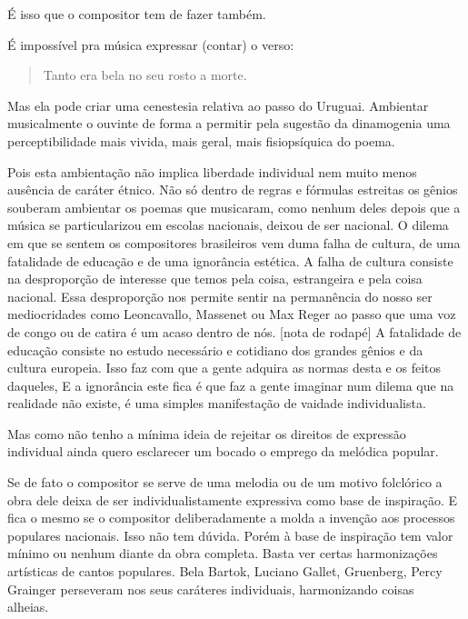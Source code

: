 É isso que o compositor tem de fazer também.~

É impossível pra música expressar (contar) o verso:~

\begin{verse}
Tanto era bela no seu rosto a morte.
\end{verse}

Mas ela pode criar uma cenestesia relativa ao passo do Uruguai.
Ambientar musicalmente o ouvinte de forma a permitir pela sugestão da
dinamogenia uma perceptibilidade mais vivida, mais geral, mais
fisiopsíquica do poema.~

Pois esta ambientação não implica liberdade individual nem muito menos
ausência de caráter étnico. Não só dentro de regras e fórmulas estreitas
os gênios souberam ambientar os poemas que musicaram, como nenhum deles
depois que a música se particularizou em escolas nacionais, deixou de
ser nacional. O dilema em que se sentem os compositores brasileiros vem
duma falha de cultura, de uma fatalidade de educação e de uma ignorância
estética. A falha de cultura consiste na desproporção de interesse que
temos pela coisa, estrangeira e pela coisa nacional. Essa desproporção
nos permite sentir na permanência do nosso ser mediocridades como
Leoncavallo, Massenet ou Max Reger ao passo que uma voz de congo ou de
catira é um acaso dentro de nós. {[}nota de rodapé{]} A fatalidade de
educação consiste no estudo necessário e cotidiano dos grandes gênios e
da cultura europeia. Isso faz com que a gente adquira as normas desta e
os feitos daqueles, E a ignorância este fica é que faz a gente imaginar
num dilema que na realidade não existe, é uma simples manifestação de
vaidade individualista.~

Mas como não tenho a mínima ideia de rejeitar os direitos de expressão
individual ainda quero esclarecer um bocado o emprego da melódica
popular.

Se de fato o compositor se serve de uma melodia ou de um motivo
folclórico a obra dele deixa de ser individualistamente expressiva como
base de inspiração. E fica o mesmo se o compositor deliberadamente a
molda a invenção aos processos populares nacionais. Isso não tem dúvida.
Porém à base de inspiração tem valor mínimo ou nenhum diante da obra
completa. Basta ver certas harmonizações artísticas de cantos populares.
Bela Bartok, Luciano Gallet, Gruenberg, Percy Grainger perseveram nos
seus caráteres individuais, harmonizando coisas alheias.~


